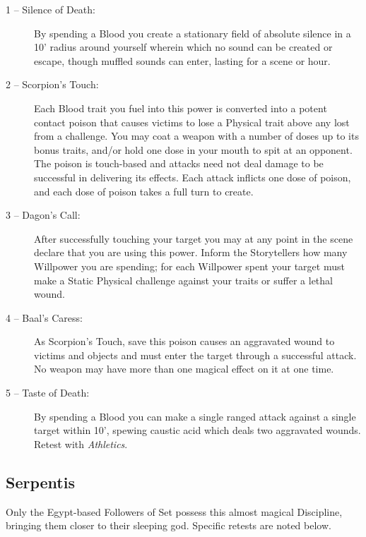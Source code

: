 \begin{description}
	\item[1 -- Silence of Death:]  By spending a Blood you create a stationary field of absolute silence in a 
	10' radius around yourself wherein which no sound can be created or escape, though muffled sounds can enter, 
	lasting for a scene or hour.
	\item[2 -- Scorpion's Touch:]  Each Blood trait you fuel into this power is converted into a potent contact 
	poison that causes victims to lose a Physical trait above any lost from a challenge.  You may coat a 
	weapon with a number of doses up to its bonus traits, and/or hold one dose in your mouth to spit at an 
	opponent.  The poison is touch-based and attacks need not deal damage to be successful in delivering its 
	effects.  Each attack inflicts one dose of poison, and each dose of poison takes a full turn to create.
	\item[3 -- Dagon's Call:]  After successfully touching your target you may at any point in the scene declare 
	that you are using this power.  Inform the Storytellers how many Willpower you are spending; for each 
	Willpower spent your target must make a Static Physical challenge against your traits or suffer a lethal 
	wound.
	\item[4 -- Baal's Caress:]  As Scorpion's Touch, save this poison causes an aggravated wound to victims and 
	objects and must enter the target through a successful attack.  No weapon may have more than one magical 
	effect on it at one time.
	\item[5 -- Taste of Death:]  By spending a Blood you can make a single ranged attack against a single target 
	within 10', spewing caustic acid which deals two aggravated wounds.  Retest with \emph{Athletics}.
\end{description}

\subsection{Serpentis}
Only the Egypt-based Followers of Set possess this almost magical Discipline, bringing them closer to their 
sleeping god.  Specific retests are noted below.

